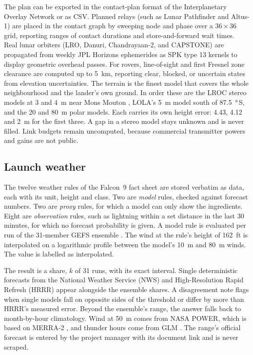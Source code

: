 \documentclass[11pt,a4paper]{article}
\begin{document}
The plan can be exported in the contact-plan format of the Interplanetary Overlay Network
or as CSV. Planned relays (such as Lunar Pathfinder and Altus-1) are placed in the contact
graph by sweeping node and phase over a $36 \times 36$ grid, reporting ranges of contact
durations and store-and-forward wait times. Real lunar orbiters (LRO, Danuri, Chandrayaan-2,
and CAPSTONE) are propagated from weekly JPL Horizons ephemerides as SPK type 13 kernels to
display geometric overhead passes. For rovers, line-of-sight and first Fresnel zone
clearance are computed up to \qty{5}{\km}, reporting clear, blocked, or uncertain states from
elevation uncertainties. The terrain is the finest model that covers the whole neighbourhood and
the lander's own ground. In order these are the LROC stereo models at 3 and \qty{4}{\m} near Mons
Mouton \citep{lrocnobile}, LOLA's \qty{5}{\m} model south of \qty{87.5}{\degree}\,S, and the
20 and \qty{80}{\m} polar models. Each carries its own height error: 4.43, 4.12 and \qty{2}{\m}
for the first three. A gap in a stereo model stays unknown and is never filled. Link budgets remain uncomputed,
because commercial transmitter powers and gains are not public.

\subsection{Launch weather}

The twelve weather rules of the Falcon~9 fact sheet \citep{nasa2020wx} are stored
verbatim as data, each with its unit, height and class. Two are \emph{model} rules,
checked against forecast numbers. Two are \emph{proxy} rules, for which a model can
only show the ingredients. Eight are \emph{observation} rules, such as lightning within
a set distance in the last 30 minutes, for which no forecast probability is given. A
model rule is evaluated per run of the 31-member GEFS ensemble \citep{guan2022}. The
wind at the rule's height of \qty{162}{ft} is interpolated on a logarithmic profile
between the model's \qty{10}{\m} and \qty{80}{\m} winds. The value is labelled as interpolated.

The result is a share, $k$ of 31 runs, with its exact interval. Single deterministic
forecasts from the National Weather Service (NWS) and High-Resolution Rapid Refresh
(HRRR) appear alongside the ensemble shares. A disagreement note flags when single models
fall on opposite sides of the threshold or differ by more than HRRR's measured error.
Beyond the ensemble's range, the answer falls back to month-by-hour climatology. Wind at
\qty{50}{\m} comes from NASA POWER, which is based on MERRA-2 \citep{gelaro2017}, and
thunder hours come from GLM \citep{virts2025}. The range's official forecast is entered by
the project manager with its document link and is never scraped.
\end{document}
